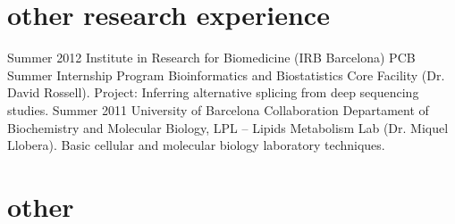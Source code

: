 \documentclass[]{friggeri-cv}
\begin{document}
\section{other research experience}

\begin{entrylist}
	\entry
	{Summer 2012}
	{Institute in Research for Biomedicine (IRB Barcelona)}
	{PCB Summer Internship Program}
	{Bioinformatics and Biostatistics Core Facility (Dr. David Rossell). Project: Inferring alternative splicing from deep sequencing studies.}
	\entry
	{Summer 2011}
	{University of Barcelona}
	{Collaboration}
	{Departament of Biochemistry and Molecular Biology, LPL -- Lipids Metabolism Lab (Dr. Miquel Llobera). Basic cellular and molecular biology laboratory techniques.}
\end{entrylist}






\section{other}

\begin{entrylist}
\end{entrylist}



% 
\end{document}
